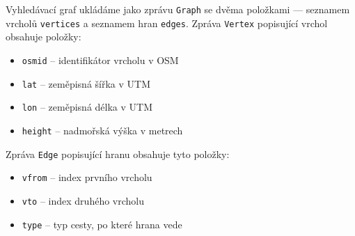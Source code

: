 Vyhledávací graf ukládáme jako zprávu \verb|Graph| se dvěma položkami ---
seznamem vrcholů \verb|vertices| a seznamem hran \verb|edges|. Zpráva
\verb|Vertex| popisující vrchol obsahuje položky:
\begin{itemize}
	\item \verb|osmid| -- identifikátor vrcholu v OSM
	\item \verb|lat| -- zeměpisná šířka v UTM
	\item \verb|lon| -- zeměpisná délka v UTM
	\item \verb|height| -- nadmořská výška v metrech
\end{itemize}
Zpráva \verb|Edge| popisující hranu obsahuje tyto položky:
\begin{itemize}
	\item \verb|vfrom| -- index prvního vrcholu
	\item \verb|vto| -- index druhého vrcholu
	\item \verb|type| -- typ cesty, po které hrana vede
\end{itemize}

